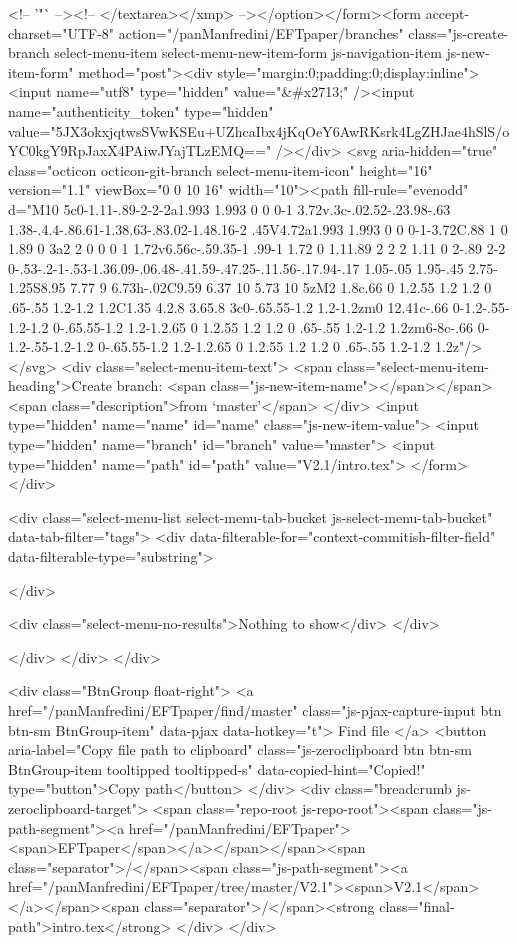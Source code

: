           <!-- '"` --><!-- </textarea></xmp> --></option></form><form accept-charset="UTF-8" action="/panManfredini/EFTpaper/branches" class="js-create-branch select-menu-item select-menu-new-item-form js-navigation-item js-new-item-form" method="post"><div style="margin:0;padding:0;display:inline"><input name="utf8" type="hidden" value="&#x2713;" /><input name="authenticity_token" type="hidden" value="5JX3okxjqtwsSVwKSEu+UZhcaIbx4jKqOeY6AwRKsrk4LgZHJae4hSlS/oYC0kgY9RpJaxX4PAiwJYajTLzEMQ==" /></div>
          <svg aria-hidden="true" class="octicon octicon-git-branch select-menu-item-icon" height="16" version="1.1" viewBox="0 0 10 16" width="10"><path fill-rule="evenodd" d="M10 5c0-1.11-.89-2-2-2a1.993 1.993 0 0 0-1 3.72v.3c-.02.52-.23.98-.63 1.38-.4.4-.86.61-1.38.63-.83.02-1.48.16-2 .45V4.72a1.993 1.993 0 0 0-1-3.72C.88 1 0 1.89 0 3a2 2 0 0 0 1 1.72v6.56c-.59.35-1 .99-1 1.72 0 1.11.89 2 2 2 1.11 0 2-.89 2-2 0-.53-.2-1-.53-1.36.09-.06.48-.41.59-.47.25-.11.56-.17.94-.17 1.05-.05 1.95-.45 2.75-1.25S8.95 7.77 9 6.73h-.02C9.59 6.37 10 5.73 10 5zM2 1.8c.66 0 1.2.55 1.2 1.2 0 .65-.55 1.2-1.2 1.2C1.35 4.2.8 3.65.8 3c0-.65.55-1.2 1.2-1.2zm0 12.41c-.66 0-1.2-.55-1.2-1.2 0-.65.55-1.2 1.2-1.2.65 0 1.2.55 1.2 1.2 0 .65-.55 1.2-1.2 1.2zm6-8c-.66 0-1.2-.55-1.2-1.2 0-.65.55-1.2 1.2-1.2.65 0 1.2.55 1.2 1.2 0 .65-.55 1.2-1.2 1.2z"/></svg>
            <div class="select-menu-item-text">
              <span class="select-menu-item-heading">Create branch: <span class="js-new-item-name"></span></span>
              <span class="description">from ‘master’</span>
            </div>
            <input type="hidden" name="name" id="name" class="js-new-item-value">
            <input type="hidden" name="branch" id="branch" value="master">
            <input type="hidden" name="path" id="path" value="V2.1/intro.tex">
</form>
      </div>

      <div class="select-menu-list select-menu-tab-bucket js-select-menu-tab-bucket" data-tab-filter="tags">
        <div data-filterable-for="context-commitish-filter-field" data-filterable-type="substring">


        </div>

        <div class="select-menu-no-results">Nothing to show</div>
      </div>

    </div>
  </div>
</div>

  <div class="BtnGroup float-right">
    <a href="/panManfredini/EFTpaper/find/master"
          class="js-pjax-capture-input btn btn-sm BtnGroup-item"
          data-pjax
          data-hotkey="t">
      Find file
    </a>
    <button aria-label="Copy file path to clipboard" class="js-zeroclipboard btn btn-sm BtnGroup-item tooltipped tooltipped-s" data-copied-hint="Copied!" type="button">Copy path</button>
  </div>
  <div class="breadcrumb js-zeroclipboard-target">
    <span class="repo-root js-repo-root"><span class="js-path-segment"><a href="/panManfredini/EFTpaper"><span>EFTpaper</span></a></span></span><span class="separator">/</span><span class="js-path-segment"><a href="/panManfredini/EFTpaper/tree/master/V2.1"><span>V2.1</span></a></span><span class="separator">/</span><strong class="final-path">intro.tex</strong>
  </div>
</div>



